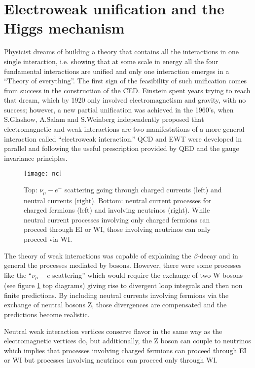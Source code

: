 \section{Electroweak unification and the Higgs mechanism}\label{sec:EWI}

\noindent Physicist dreams of building a theory that contains all the interactions in one single interaction, i.e. showing that at some scale in energy all the four fundamental interactions are unified and only one interaction emerges in a ``Theory of everything''. The first sign of the feasibility of such unification comes from success in the construction of the CED. Einstein spent years trying to reach that dream, which by 1920 only involved electromagnetism and gravity, with no success; however, a new partial unification was achieved in the 1960's, when S.Glashow\cite{glashow}, A.Salam\cite{salam} and S.Weinberg \cite{weinberg} independently proposed that electromagnetic and weak interactions are two manifestations of a more general interaction called ``electroweak interaction.'' QCD and EWT were developed in parallel and following the useful prescription provided by QED and the gauge invariance principles.\\
\begin{figure}[h!]
  \centering
  \texttt{[image: nc]}
  \caption[Neutral current processes]{Top: $\nu_{\mu}-e^-$ scattering going through charged currents (left) and neutral currents (right). Bottom: neutral current processes for charged fermions (left) and involving neutrinos (right). While neutral current processes involving only charged fermions can proceed through EI or WI, those involving neutrinos can only proceed via WI.}%
         \label{nc}
\end{figure}
         
\noindent The theory of weak interactions was capable of explaining the $\beta$-decay and in general the processes mediated by \wpm bosons. However, there were some processes like the ``$\nu_\mu - e$ scattering'' which would require the exchange of two W bosons (see figure \ref{nc} top diagrams) giving rise to divergent loop integrals and then non finite predictions. By including neutral currents involving fermions via the exchange of neutral bosons Z, those divergences are compensated and the predictions become realistic.

\noindent Neutral weak interaction vertices conserve flavor in the same way as the electromagnetic vertices do, but additionally, the Z boson can couple to neutrinos which implies that processes involving charged fermions can proceed through EI or WI but processes involving neutrinos can proceed only through WI.\\   

